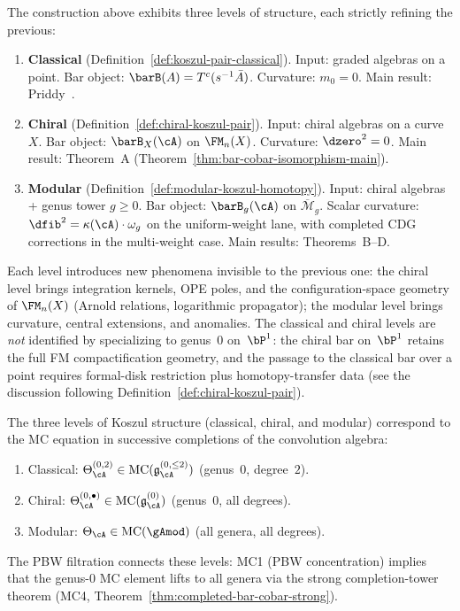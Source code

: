 \begin{remark}\label{rem:three-koszul-levels}
The construction above exhibits three levels of structure, each
strictly refining the previous:
\begin{enumerate}[leftmargin=2em]
\item \textbf{Classical} (Definition~\ref{def:koszul-pair-classical}).
 Input: graded algebras on a point. Bar object: $\barB(A) = T^c(s^{-1}\bar{A})$.
 Curvature: $m_0 = 0$. Main result: Priddy~\cite{Priddy70}.
\item \textbf{Chiral} (Definition~\ref{def:chiral-koszul-pair}).
 Input: chiral algebras on a curve~$X$. Bar object: $\barB_X(\cA)$
 on $\FM_n(X)$. Curvature: $\dzero^2 = 0$. Main result: Theorem~A
 (Theorem~\ref{thm:bar-cobar-isomorphism-main}).
\item \textbf{Modular} (Definition~\ref{def:modular-koszul-homotopy}).
 Input: chiral algebras + genus tower $g \geq 0$. Bar object:
 $\barB_g(\cA)$ on $\overline{\mathcal{M}}_g$. Scalar curvature:
 $\dfib^2 = \kappa(\cA)\cdot \omega_g$ on the uniform-weight lane,
 with completed CDG corrections in the multi-weight case. Main
 results: Theorems~B--D.
\end{enumerate}
Each level introduces new phenomena invisible to the previous one:
the chiral level brings integration kernels, OPE poles, and the
configuration-space geometry of $\FM_n(X)$ (Arnold relations,
logarithmic propagator); the modular level brings curvature,
central extensions, and anomalies. The classical and chiral levels
are \emph{not} identified by specializing to genus~$0$ on~$\bP^1$:
the chiral bar on~$\bP^1$ retains the full FM compactification
geometry, and the passage to the classical bar over a point requires
formal-disk restriction plus homotopy-transfer data (see the
discussion following Definition~\ref{def:chiral-koszul-pair}).
\end{remark}

\begin{proposition}
\label{prop:three-levels-mc-completion}
\ClaimStatusConditional
The three levels of Koszul structure (classical, chiral, and modular) correspond to the MC equation in successive completions of the convolution algebra:
\begin{enumerate}[label=\textup{(\roman*)}]
\item Classical: $\Theta_\cA^{(0,2)} \in \mathrm{MC}(\mathfrak{g}^{(0,\leq 2)}_\cA)$ (genus~$0$, degree~$2$).
\item Chiral: $\Theta_\cA^{(0,\bullet)} \in \mathrm{MC}(\mathfrak{g}^{(0)}_\cA)$ (genus~$0$, all degrees).
\item Modular: $\Theta_\cA \in \mathrm{MC}(\gAmod)$ (all genera, all degrees).
\end{enumerate}
The PBW filtration connects these levels: MC1 (PBW concentration) implies that the genus-$0$ MC element lifts to all genera via the strong completion-tower theorem (MC4, Theorem~\ref{thm:completed-bar-cobar-strong}).
\end{proposition}


